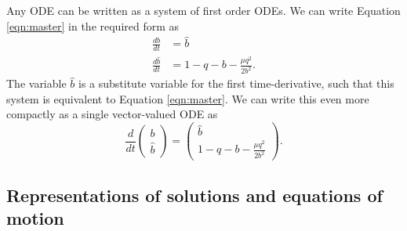 \documentclass{report}
\begin{document}
Any ODE can be written as a system of first order ODEs.
We can write Equation \ref{eqn:master} in the required form as
\begin{equation}
	\begin{aligned}
		\frac{db}{dt}       & = \hat{b}                         \\
		\frac{d\hat{b}}{dt} & = 1 - q - b - \frac{\mu q^2}{2b^2}.
	\end{aligned}
	\label{eqn:first_order_system}
\end{equation}
The variable $\hat{b}$ is a substitute variable for the first time-derivative,
such that this system is equivalent to Equation \ref{eqn:master}.
We can write this even more compactly as a single vector-valued ODE as
\begin{equation}
	\frac{d}{dt}\begin{pmatrix}
		b \\
		\hat{b}
	\end{pmatrix} = \begin{pmatrix}
		\hat{b} \\
		1 - q - b - \frac{\mu q^2}{2b^2}
	\end{pmatrix}.
	\label{eqn:vector_system}
\end{equation}

\subsection{Representations of solutions and equations of motion}
\end{document}
